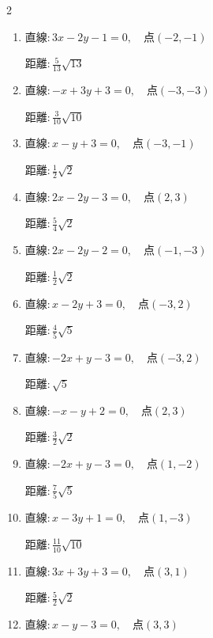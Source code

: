 \begin{multicols}{2}
\begin{enumerate}
  \item $直線:3x-2y-1=0,\quad 点 ( -2, -1 )$

        $\displaystyle 距離 : \frac{5}{13}\sqrt{13}$

  \item $直線:-x+3y+3=0,\quad 点 ( -3, -3 )$

        $\displaystyle 距離 : \frac{3}{10}\sqrt{10}$

  \item $直線:x-y+3=0,\quad 点 ( -3, -1 )$

        $\displaystyle 距離 : \frac{1}{2}\sqrt{2}$

  \item $直線:2x-2y-3=0,\quad 点 ( 2, 3 )$

        $\displaystyle 距離 : \frac{5}{4}\sqrt{2}$

  \item $直線:2x-2y-2=0,\quad 点 ( -1, -3 )$

        $\displaystyle 距離 : \frac{1}{2}\sqrt{2}$

  \item $直線:x-2y+3=0,\quad 点 ( -3, 2 )$

        $\displaystyle 距離 : \frac{4}{5}\sqrt{5}$

  \item $直線:-2x+y-3=0,\quad 点 ( -3, 2 )$

        $\displaystyle 距離 : \sqrt{5}$

  \item $直線:-x-y+2=0,\quad 点 ( 2, 3 )$

        $\displaystyle 距離 : \frac{3}{2}\sqrt{2}$

\columnbreak %

\resetques

  \item $直線:-2x+y-3=0,\quad 点 ( 1, -2 )$

        $\displaystyle 距離 : \frac{7}{5}\sqrt{5}$

  \item $直線:x-3y+1=0,\quad 点 ( 1, -3 )$

        $\displaystyle 距離 : \frac{11}{10}\sqrt{10}$

  \item $直線:3x+3y+3=0,\quad 点 ( 3, 1 )$

        $\displaystyle 距離 : \frac{5}{2}\sqrt{2}$

  \item $直線:x-y-3=0,\quad 点 ( 3, 3 )$


\end{enumerate}
\end{multicols}
